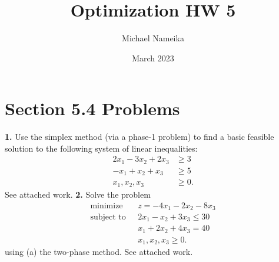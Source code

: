 \documentclass{article}
\title{Optimization HW 5}
\author{Michael Nameika}
\date{March 2023}
\begin{document}
\maketitle

\section*{Section 5.4 Problems}
\textbf{1.} Use the simplex method (via a phase-1 problem) to find a basic feasible solution to the following system of linear inequalities:
\begin{align*}
    2x_1 - 3x_2 + 2x_3 &\geq 3\\
    -x_1 + x_2 + x_3 &\geq 5\\
    x_1,x_2,x_3 &\geq 0.
\end{align*}
\newline\newline
See attached work.
\newline\newline
\textbf{2.} Solve the problem
\begin{align*}
    \text{minimize} \:\:\: &z = -4x_1 - 2x_2 - 8x_3\\
    \text{subject to} \:\:\: &2x_1 - x_2 + 3x_3 \leq 30\\
    &x_1 + 2x_2 + 4x_3 = 40\\
    &x_1,x_2,x_3 \geq 0.
\end{align*}
using (a) the two-phase method.
\newline\newline
See attached work.
\end{document}
